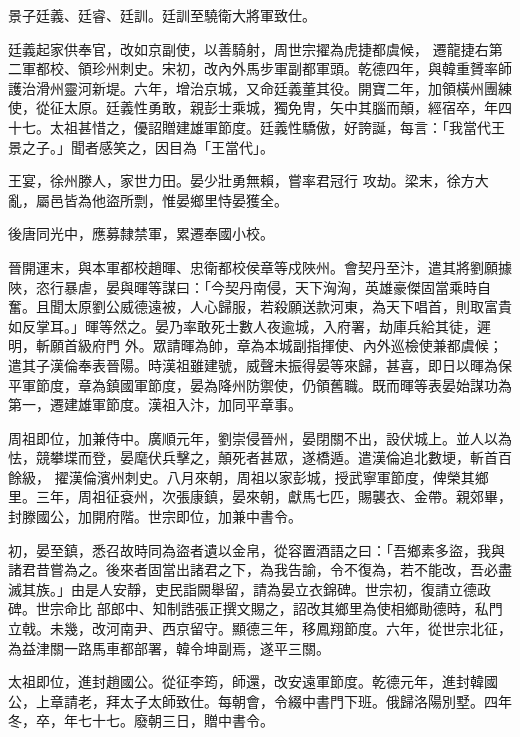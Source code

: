 \begin{pinyinscope}
 景子廷義、廷睿、廷訓。廷訓至驍衛大將軍致仕。



 廷義起家供奉官，改如京副使，以善騎射，周世宗擢為虎捷都虞候，
 遷龍捷右第二軍都校、領珍州刺史。宋初，改內外馬步軍副都軍頭。乾德四年，與韓重贇率師護治滑州靈河新堤。六年，增治京城，又命廷義董其役。開寶二年，加領橫州團練使，從征太原。廷義性勇敢，親彭士乘城，獨免冑，矢中其腦而顛，經宿卒，年四十七。太祖甚惜之，優詔贈建雄軍節度。廷義性驕傲，好誇誕，每言：「我當代王景之子。」聞者感笑之，因目為「王當代」。



 王宴，徐州滕人，家世力田。晏少壯勇無賴，嘗率君冠行
 攻劫。梁末，徐方大亂，屬邑皆為他盜所剽，惟晏鄉里恃晏獲全。



 後唐同光中，應募隸禁軍，累遷奉國小校。



 晉開運末，與本軍都校趙暉、忠衛都校侯章等戍陜州。會契丹至汴，遣其將劉願據陜，恣行暴虐，晏與暉等謀曰：「今契丹南侵，天下洶洶，英雄豪傑固當乘時自奮。且聞太原劉公威德遠被，人心歸服，若殺願送款河東，為天下唱首，則取富貴如反掌耳。」暉等然之。晏乃率敢死士數人夜逾城，入府署，劫庫兵給其徒，遲明，斬願首級府門
 外。眾請暉為帥，章為本城副指揮使、內外巡檢使兼都虞候；遣其子漢倫奉表晉陽。時漢祖雖建號，威聲未振得晏等來歸，甚喜，即日以暉為保平軍節度，章為鎮國軍節度，晏為降州防禦使，仍領舊職。既而暉等表晏始謀功為第一，遷建雄軍節度。漢祖入汴，加同平章事。



 周祖即位，加兼侍中。廣順元年，劉崇侵晉州，晏閉關不出，設伏城上。並人以為怯，競攀堞而登，晏麾伏兵擊之，顛死者甚眾，遂橋遁。遣漢倫追北數埂，斬首百餘級，
 擢漢倫濱州刺史。八月來朝，周祖以家彭城，授武寧軍節度，俾榮其鄉里。三年，周祖征袞州，次張康鎮，晏來朝，獻馬七匹，賜襲衣、金帶。親郊畢，封滕國公，加開府階。世宗即位，加兼中書令。



 初，晏至鎮，悉召故時同為盜者遺以金帛，從容置酒語之曰：「吾鄉素多盜，我與諸君昔嘗為之。後來者固當出諸君之下，為我告諭，令不復為，若不能改，吾必盡滅其族。」由是人安靜，吏民詣闕舉留，請為晏立衣錦碑。世宗初，復請立德政碑。世宗命比
 部郎中、知制誥張正撰文賜之，詔改其鄉里為使相鄉勛德時，私門立戟。未幾，改河南尹、西京留守。顯德三年，移鳳翔節度。六年，從世宗北征，為益津關一路馬車都部署，韓令坤副焉，遂平三關。



 太祖即位，進封趙國公。從征李筠，師還，改安遠軍節度。乾德元年，進封韓國公，上章請老，拜太子太師致仕。每朝會，令綴中書門下班。俄歸洛陽別墅。四年冬，卒，年七十七。廢朝三日，贈中書令。




\end{pinyinscope}
